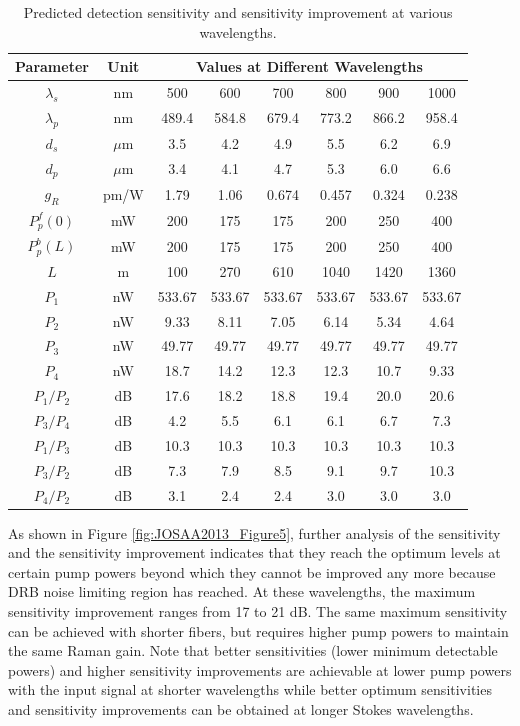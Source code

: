 \begin{table}[t]
\begin{centering}
\begin{tabular}{|c|c|c|c|c|c|c|c|} \hline
Parameter & Unit & \multicolumn{6}{|c|}{Values at Different Wavelengths} \\ \hline\hline
$\lambda_s$ & nm & 500 & 600 & 700 & 800 & 900 & 1000 \\ \hline
$\lambda_p$ & nm & 489.4 & 584.8 & 679.4 & 773.2 & 866.2 & 958.4 \\ \hline
$d_s$ & $\mu$m & 3.5 & 4.2 & 4.9 & 5.5 & 6.2 & 6.9 \\ \hline
$d_p$ & $\mu$m & 3.4 & 4.1 & 4.7 & 5.3 & 6.0 & 6.6 \\ \hline
$g_R$ & pm/W & 1.79 & 1.06 & 0.674 & 0.457 & 0.324 & 0.238 \\ \hline
$P_p^f(0)$ &mW & 200 & 175 & 175 & 200 & 250 & 400 \\ \hline
$P_p^b(L)$ &mW & 200 & 175 & 175 & 200 & 250 & 400 \\ \hline
$L$ &m & 100 & 270 & 610 & 1040 & 1420 & 1360 \\ \hline
$P_1$ &nW  & 533.67 & 533.67 & 533.67 & 533.67 & 533.67 & 533.67 \\ \hline
$P_2$ &nW  & 9.33 & 8.11 & 7.05 & 6.14 & 5.34 & 4.64 \\ \hline
$P_3$ &nW  & 49.77 & 49.77 & 49.77 & 49.77 & 49.77 & 49.77 \\ \hline
$P_4$ &nW  & 18.7 & 14.2 & 12.3 & 12.3 & 10.7 & 9.33 \\ \hline
$P_1/P_2$ &dB & 17.6 & 18.2 & 18.8 & 19.4 & 20.0 & 20.6 \\ \hline
$P_3/P_4$ &dB  & 4.2 & 5.5 & 6.1 & 6.1 & 6.7 & 7.3 \\ \hline
$P_1/P_3$ &dB & 10.3 & 10.3 & 10.3 & 10.3 & 10.3 & 10.3 \\ \hline
$P_3/P_2$ &dB  & 7.3 & 7.9 & 8.5 & 9.1 & 9.7 & 10.3 \\ \hline
$P_4/P_2$ &dB  & 3.1 & 2.4 & 2.4 & 3.0 & 3.0 & 3.0 \\ \hline
\end{tabular}
\caption{Predicted detection sensitivity and sensitivity improvement at various wavelengths.}
\label{tbl:JOSAA2013_Table2}
\end{centering}
\end{table}
 
As shown in Figure \ref{fig:JOSAA2013_Figure5}, further analysis of the sensitivity and the sensitivity improvement indicates that they reach the optimum levels at certain pump powers beyond which they cannot be improved any more because DRB noise limiting region has reached. At these wavelengths, the maximum sensitivity improvement ranges from 17 to 21 dB. The same maximum sensitivity can be achieved with shorter fibers, but requires higher pump powers to maintain the same Raman gain. Note that better sensitivities (lower minimum detectable powers) and higher sensitivity improvements are achievable at lower pump powers with the input signal at shorter wavelengths while better optimum sensitivities and sensitivity improvements can be obtained at longer Stokes wavelengths.


